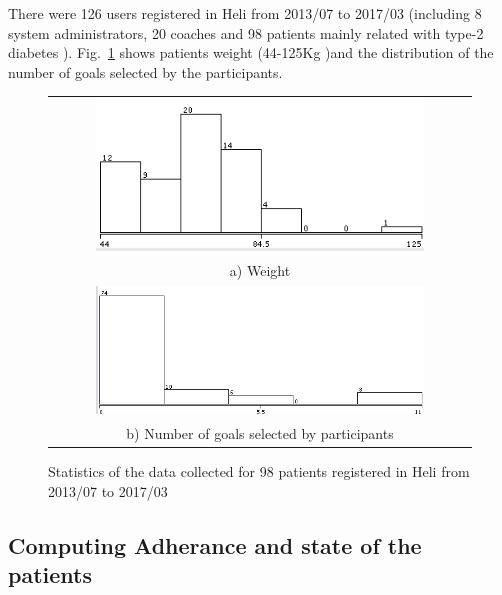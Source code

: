 \documentclass{llncs}
\begin{document}
There were 126 users registered in Heli from 2013/07 to 2017/03 (including 8 system administrators, 20 coaches and 98 patients mainly related with type-2 diabetes ). Fig.~\ref{Fig.Weight-Goals} shows patients weight (44-125Kg )and the distribution of the number of goals selected by the participants.
\vspace*{-\baselineskip}\begin{figure}[h]
  \begin{center}
  \begin{tabular}{c}
     \includegraphics[width=0.8\textwidth]{Weight.png}\\
          a) Weight\\
   \includegraphics[width=0.8\textwidth]{Goals.png}\\
 b) Number of goals selected by participants\\
    \end{tabular}
    \caption{Statistics of the data collected for 98 patients registered in Heli from 2013/07 to 2017/03}
     \label{Fig.Weight-Goals}
\end{center}
\end{figure} 

\subsection {Computing Adherance and state of the patients}
\end{document}
